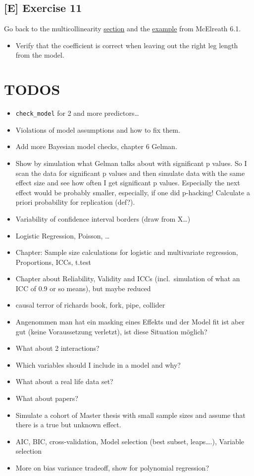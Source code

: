 \documentclass[
]{book}
\providecommand{\tightlist}{%
  \setlength{\itemsep}{0pt}\setlength{\parskip}{0pt}}
\begin{document}
\subsection{{[}E{]} Exercise 11}\label{exercise11_multiple_regression}

Go back to the multicollinearity \hyperref[multicollinearity]{section} and the \hyperref[mcElreath_6.1]{example}
from McElreath 6.1.

\begin{itemize}
\tightlist
\item
  Verify that the coefficient is correct when leaving out the right leg length from the model.
\end{itemize}

\section{TODOS}\label{todos}

\begin{itemize}
\tightlist
\item
  \texttt{check\_model} for 2 and more predictors\ldots{}
\item
  Violations of model assumptions and how to fix them.
\item
  Add more Bayesian model checks, chapter 6 Gelman.
\item
  Show by simulation what Gelman talks about with significant p values. So I scan the data
  for significant p values and then simulate data with the same effect size and see how often
  I get significant p values. Especially the next effect would be probably smaller,
  especially, if one did p-hacking! Calculate a priori probability for replication (def?).
\item
  Variability of confidence interval borders (draw from X\ldots)
\item
  Logistic Regression, Poisson, \ldots{}
\item
  Chapter: Sample size calculations for logistic and multivariate regression, Proportions, ICCs, t.test
\item
  Chapter about Reliability, Validity and ICCs (incl.~simulation of what an ICC of 0.9 or so means), but maybe reduced
\item
  causal terror of richards book, fork, pipe, collider
\item
  Angenommen man hat ein masking eines Effekts und der Model fit ist aber gut (keine Voraussetzung verletzt),
  ist diese Situation möglich?
\item
  What about 2 interactions?
\item
  Which variables should I include in a model and why?
\item
  What about a real life data set?
\item
  What about papers?
\item
  Simulate a cohort of Master thesis with small sample sizes and assume
  that there is a true but unknown effect.
\item
  AIC, BIC, cross-validation, Model selection (best subset, leaps\ldots.), Variable selection
\item
  More on bias variance tradeoff, show for polynomial regression?
\end{itemize}


\end{document}
